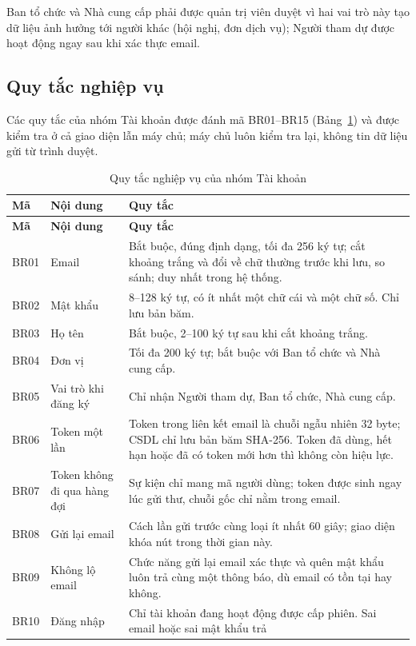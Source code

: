 Ban tổ chức và Nhà cung cấp phải được quản trị viên duyệt vì hai vai trò này tạo dữ liệu ảnh hưởng
tới người khác (hội nghị, đơn dịch vụ); Người tham dự được hoạt động ngay sau khi xác thực email.

\subsection{Quy tắc nghiệp vụ}

Các quy tắc của nhóm Tài khoản được đánh mã BR01--BR15 (Bảng~\ref{tab:tk-quy-tac}) và được kiểm tra
ở cả giao diện lẫn máy chủ; máy chủ luôn kiểm tra lại, không tin dữ liệu gửi từ trình duyệt.

\begin{longtable}{p{1.3cm}p{3.2cm}p{9.9cm}}
  \caption{Quy tắc nghiệp vụ của nhóm Tài khoản}\label{tab:tk-quy-tac}\\
  \toprule
  \textbf{Mã} & \textbf{Nội dung} & \textbf{Quy tắc} \\
  \midrule
  \endfirsthead
  \toprule
  \textbf{Mã} & \textbf{Nội dung} & \textbf{Quy tắc} \\
  \midrule
  \endhead
  BR01 & Email & Bắt buộc, đúng định dạng, tối đa 256 ký tự; cắt khoảng trắng và đổi về chữ thường
  trước khi lưu, so sánh; duy nhất trong hệ thống. \\
  BR02 & Mật khẩu & 8--128 ký tự, có ít nhất một chữ cái và một chữ số. Chỉ lưu bản băm. \\
  BR03 & Họ tên & Bắt buộc, 2--100 ký tự sau khi cắt khoảng trắng. \\
  BR04 & Đơn vị & Tối đa 200 ký tự; bắt buộc với Ban tổ chức và Nhà cung cấp. \\
  BR05 & Vai trò khi đăng ký & Chỉ nhận Người tham dự, Ban tổ chức, Nhà cung cấp. \\
  BR06 & Token một lần & Token trong liên kết email là chuỗi ngẫu nhiên 32 byte; CSDL chỉ lưu
  bản băm SHA-256. Token đã dùng, hết hạn hoặc đã có token mới hơn thì không còn hiệu lực. \\
  BR07 & Token không đi qua hàng đợi & Sự kiện chỉ mang mã người dùng; token được sinh ngay lúc
  gửi thư, chuỗi gốc chỉ nằm trong email. \\
  BR08 & Gửi lại email & Cách lần gửi trước cùng loại ít nhất 60 giây; giao diện khóa nút trong
  thời gian này. \\
  BR09 & Không lộ email & Chức năng gửi lại email xác thực và quên mật khẩu luôn trả cùng một thông
  báo, dù email có tồn tại hay không. \\
  BR10 & Đăng nhập & Chỉ tài khoản đang hoạt động được cấp phiên. Sai email hoặc sai mật khẩu trả

\end{longtable}
